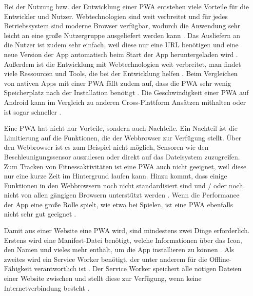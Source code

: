 Bei der Nutzung bzw. der Entwicklung einer \ac{PWA} entstehen viele Vorteile für die Entwickler und Nutzer. Webtechnologien sind weit verbreitet und für jedes Betriebssystem sind moderne Browser verfügbar, wodurch die Anwendung sehr leicht an eine große Nutzergruppe ausgeliefert werden kann \autocite{Rojas2020}. Das Ausliefern an die Nutzer ist zudem sehr einfach, weil diese nur eine URL benötigen \autocite{KHAN2019289} und eine neue Version der App automatisch beim Start der App heruntergeladen wird \autocite{Rojas2020}. Außerdem ist die Entwicklung mit Webtechnologien weit verbreitet, man findet viele Ressourcen und Tools, die bei der Entwicklung helfen \autocite{Rojas2020}. Beim Vergleichen von nativen Apps mit einer \ac{PWA} fällt zudem auf, dass die \ac{PWA} sehr wenig Speicherplatz nach der Installation benötigt \autocite{biorn2017} \autocite{KHAN2019289}. Die Geschwindigkeit einer \ac{PWA} auf Android kann im Vergleich zu anderen Cross-Plattform Ansätzen mithalten oder ist sogar schneller \autocite{biorn2017}.

Eine \ac{PWA} hat nicht nur Vorteile, sondern auch Nachteile. Ein Nachteil ist die Limitierung auf die Funktionen, die der Webbrowser zur Verfügung stellt. Über den Webbrowser ist es zum Beispiel nicht möglich, Sensoren wie den Beschleunigungssensor auszulesen oder direkt auf das Dateisystem zuzugreifen. Zum Tracken von Fitnessaktivitäten ist eine \ac{PWA} auch nicht geeignet, weil diese nur eine kurze Zeit im Hintergrund laufen kann. Hinzu kommt, dass einige Funktionen in den Webbrowsern noch nicht standardisiert sind und / oder noch nicht von allen gängigen Browsern unterstützt werden \autocite{majchrzak2018} \autocite{biorn2017}. Wenn die Performance der App eine große Rolle spielt, wie etwa bei Spielen, ist eine \ac{PWA} ebenfalls nicht sehr gut geeignet \autocite{biorn2017}.

Damit aus einer Website eine \ac{PWA} wird, sind mindestens zwei Dinge erforderlich. Erstens wird eine Manifest-Datei benötigt, welche Informationen über das Icon, den Namen und vieles mehr enthält, um die App installieren zu können \autocite{Hajian2019} \autocite{Rojas2020}. Als zweites wird ein Service Worker benötigt, der unter anderem für die Offline-Fähigkeit verantwortlich ist \autocite{Rojas2020}. Der Service Worker speichert alle nötigen Dateien einer Website zwischen und stellt diese zur Verfügung, wenn keine Internetverbindung besteht \autocite{Rojas2020}.

